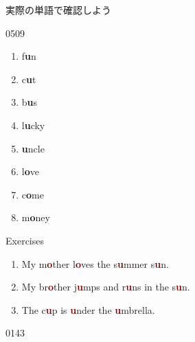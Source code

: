 \documentclass[aspectratio=169,xcolor={dvipsnames,table}]{beamer}
\begin{document}
\begin{frame}[plain]{実際の単語で確認しよう}

\LARGE
\hfill{\tiny 0509}\,{\scriptsize {}}

\begin{enumerate}
 \item f\textcolor{NavyBlue}{\bfseries u}n%
\hfill{}\hspace{150pt}\mbox{}
 \item c\textcolor{NavyBlue}{\bfseries u}t%
\hfill{}\hspace{150pt}\mbox{}
 \item b\textcolor{NavyBlue}{\bfseries u}s%
\hfill{}\hspace{150pt}\mbox{}
 \item l\textcolor{NavyBlue}{\bfseries u}cky%
\hfill{}\hspace{150pt}\mbox{}
 \item \textcolor{NavyBlue}{\bfseries u}ncle%
\hfill{}\hspace{150pt}\mbox{}
 \item l\textcolor{NavyBlue}{\bfseries o}ve%
\hfill{}\hspace{150pt}\mbox{} 
\item c\textcolor{NavyBlue}{\bfseries o}me%
\hfill{}\hspace{150pt}\mbox{}
 \item m\textcolor{NavyBlue}{\bfseries o}ney%
\hfill{}\hspace{150pt}\mbox{}
\end{enumerate}
\end{frame}
\begin{frame}[plain]{Exercises }

\LARGE

\begin{enumerate}
 \item My m\textcolor{Maroon}{\bfseries o}ther l\textcolor{Maroon}{\bfseries o}ves the s\textcolor{Maroon}{\bfseries u}mmer s\textcolor{Maroon}{\bfseries u}n.
 \item My br\textcolor{Maroon}{\bfseries o}ther j\textcolor{Maroon}{\bfseries u}mps and r\textcolor{Maroon}{\bfseries u}ns in the s\textcolor{Maroon}{\bfseries u}n.
 \item The c\textcolor{Maroon}{\bfseries u}p is \textcolor{Maroon}{\bfseries u}nder the \textcolor{Maroon}{\bfseries u}mbrella.
\end{enumerate}

\hfill\tiny{0143}\,{\scriptsize {}}

\end{frame}
\end{document}
